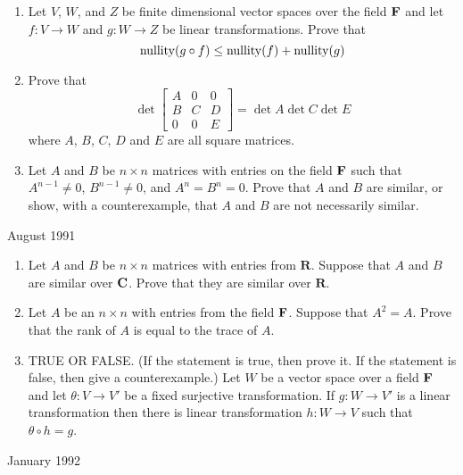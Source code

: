 \documentclass[11pt]{amsart}
\renewcommand{\(}{\left(}
\renewcommand{\)}{\right)}
\renewcommand{\[}{\left[}
\renewcommand{\]}{\right]}
\newcommand{\cn}{\mbox{\bf C}}
\newcommand{\R}{{\mathbf R}}
\newcommand{\heading}[1]{\centerline{\large\sc #1}}
\newcommand{\num}{\begin{enumerate}}
\newcommand{\enum}{\end{enumerate}}
\newcommand{\fe}{{\bf F}}
\begin{document}
\num
\item
Let $V$, $W$, and $Z$ be finite dimensional vector spaces over the
field $\fe$ and let $f:V\to W$ and $g:W\to Z$ be linear
transformations.  Prove that
$$
\mathop{\rm nullity}(g\circ f)\le \mathop{\rm nullity}( f)
+\mathop{\rm nullity}( g)
$$
\item Prove that 
$$
\det\[\begin{array}{ccc}A&0&0\\B&C&D\\ 0&0&E\end{array}\]
	=\det A\det C\det E
$$
where $A$, $B$, $C$, $D$ and $E$ are all square matrices.
\item Let $A$ and $B$ be $n\times n$ matrices with entries on the
field $\fe$ such that $A^{n-1}\ne0$, $B^{n-1}\ne 0$, and $A^n=B^n=0$.
Prove that $A$ and $B$ are similar, or show, with a counterexample,
that $A$ and $B$ are not necessarily similar.
\enum

\heading{August 1991}

\num
\item Let $A$ and $B$ be $n\times n$ matrices with entries from $\R$.
Suppose that $A$ and $B$ are similar over $\cn$.  Prove that they are
similar over $\R$.
\item Let $A$ be an $n\times n$ with entries from the field $\fe$.
Suppose that $A^2=A$.  Prove that the rank of $A$ is equal to the
trace of $A$.
\item TRUE OR FALSE. (If the statement is true, then prove it.  If the
statement is false, then give a counterexample.) Let $W$ be a vector
space over a field $\fe$ and let $\theta:V\to V'$ be a fixed
surjective transformation. If $g:W\to V'$ is a linear transformation
then there is linear transformation $h:W\to V$ such that $\theta\circ
h=g$.  \enum

\heading{January 1992}
\end{document}
